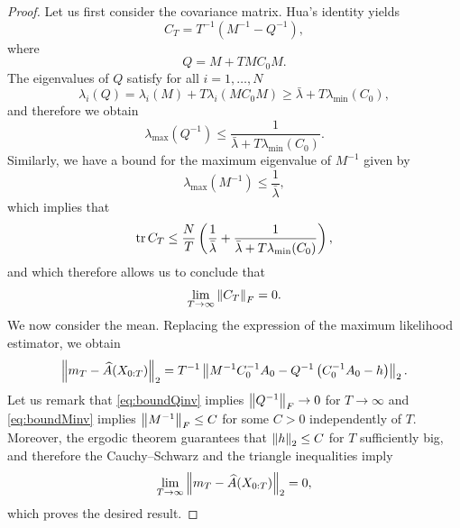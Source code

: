 \documentclass[10pt]{article}
\begin{document}
\begin{proof} Let us first consider the covariance matrix. Hua's identity yields
	\begin{equation}
		C_T = T^{-1} \left(M^{-1} - Q^{-1}\right),
	\end{equation}
	where 
	\begin{equation}
		Q = M + T M C_0 M.
	\end{equation}
	The eigenvalues of $Q$ satisfy for all $i = 1, \ldots, N$
	\begin{equation}
		\lambda_i(Q) = \lambda_i(M) + T \lambda_i(M C_0 M) \geq \bar \lambda + T \lambda_{\min}(C_0),
	\end{equation}
	and therefore we obtain
	\begin{equation}\label{eq:boundQinv}
		\lambda_{\max}(Q^{-1}) \leq \frac{1}{\bar \lambda + T \lambda_{\min}(C_0)}.
	\end{equation}
	Similarly, we have a bound for the maximum eigenvalue of $M^{-1}$ given by
	\begin{equation}\label{eq:boundMinv}
		\lambda_{\max}(M^{-1}) \leq \frac1{\bar{\lambda}},
	\end{equation}
	which implies that
	\begin{equation}
		\operatorname{tr}{C_T} \leq \frac{N}{T} \left(\frac1{\bar{\lambda}} + \frac{1}{\bar \lambda + T \lambda_{\min}(C_0)}\right),
	\end{equation}
	and which therefore allows us to conclude that
	\begin{equation}
		\lim_{T\to\infty} \left\|C_T\right\|_F = 0.
	\end{equation}
	We now consider the mean. Replacing the expression of the maximum likelihood estimator, we obtain
	\begin{equation}
		\left\|m_T - \widehat A(X_{0:T})\right\|_2 = T^{-1}\left\|M^{-1}C_0^{-1}A_0 - Q^{-1}\left(C_0^{-1}A_0 -h \right)\right\|_2.
	\end{equation}
	Let us remark that \eqref{eq:boundQinv} implies $\left\|Q^{-1}\right\|_F \to 0$ for $T \to \infty$ and \eqref{eq:boundMinv} implies $\left\|M^{-1}\right\|_F \leq C$ for some $C > 0$ independently of $T$. Moreover, the ergodic theorem guarantees that $\left\|h\right\|_2 \leq C$ for $T$ sufficiently big, and therefore the Cauchy--Schwarz and the triangle inequalities imply 
	\begin{equation}
		\lim_{T\to\infty} \left\|m_T - \widehat A(X_{0:T})\right\|_2 = 0,
	\end{equation}
	which proves the desired result.
\end{proof}
\end{document}
